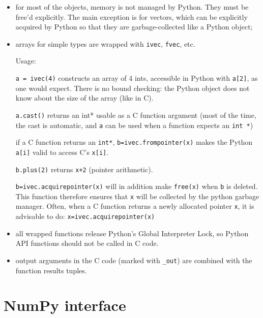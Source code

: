 \documentclass[a4paper,11pt,notitlepage,final,twoside]{report}
\newcommand{\tc}[1]{\texttt{#1}}
\begin{document}
\begin{itemize}
\item for most of the objects, memory is not managed by Python. They must be free'd explicitly. The main exception is for vectors, which can be explicitly acquired by Python so that they are garbage-collected like a Python object;
\item arrays for simple types are wrapped with \tc{ivec}, \tc{fvec}, etc. 

  Usage:

      \tc{a = ivec(4)} constructs an array of 4 ints, accessible in Python with \tc{a[2]}, as one would expect. There is no bound checking: the Python object does not know about the size of the array (like in C).

      \tc{a.cast()} returns an int* usable as a C function argument (most of the time, the cast is automatic, and \tc{a} can be used when a function expects an \tc{int *})
      
      if a C function returns an \tc{int*}, \tc{b=ivec.frompointer(x)} makes the Python \tc{a[i]} valid to access C's \tc{x[i]}.

      \tc{b.plus(2)} returns \tc{x+2} (pointer arithmetic).

      \tc{b=ivec.acquirepointer(x)} will in addition make \tc{free(x)} when \tc{b} is deleted. This function therefore ensures that \tc{x} will be collected 
by the python garbage manager. Often, when a C function returns a newly allocated pointer \tc{x}, it is advisable to do: \tc{x=ivec.acquirepointer(x)}


\item all wrapped functions release Python's Global Interpreter Lock, so Python API functions should not be called in C code.

\item output arguments in the C code (marked with \tc{\_out}) are combined with the function results tuples. 
\end{itemize}


\section{NumPy interface}
\end{document}
